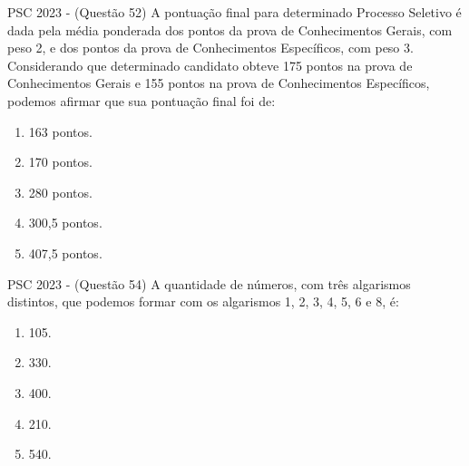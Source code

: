\documentclass[aspectratio=169]{beamer}
\newif\ifusarcorvermelha
\newcommand{\vermelho}[1]{%
    \ifusarcorvermelha
        {\color{red}#1}%
    \else
        #1%
    \fi
}
\begin{document}
    \begin{frame}{PSC 2023 - (Questão 52)}
        A pontuação final para determinado Processo Seletivo é dada pela média ponderada dos pontos da prova de Conhecimentos Gerais, com peso 2, e dos pontos da prova de Conhecimentos Específicos, com peso 3. Considerando que determinado candidato obteve 175 pontos na prova de Conhecimentos Gerais e 155 pontos na prova de Conhecimentos Específicos, podemos afirmar que sua pontuação final foi de:

            \begin{enumerate}[a]
                \item \vermelho{163 pontos.} %
                \item 170 pontos.
                \item 280 pontos.
                \item 300,5 pontos.
                \item 407,5 pontos.
            \end{enumerate}
    
    \end{frame}

    \begin{frame}{PSC 2023 - (Questão 54)}
        A quantidade de números, com três algarismos distintos, que podemos formar com os algarismos 1, 2, 3, 4, 5, 6 e 8, é:

            \begin{enumerate}[a]
                \item 105.
                \item 330.
                \item 400.
                \item \vermelho{210.} %
                \item 540.
            \end{enumerate}
    
    \end{frame}
   
\end{document}
